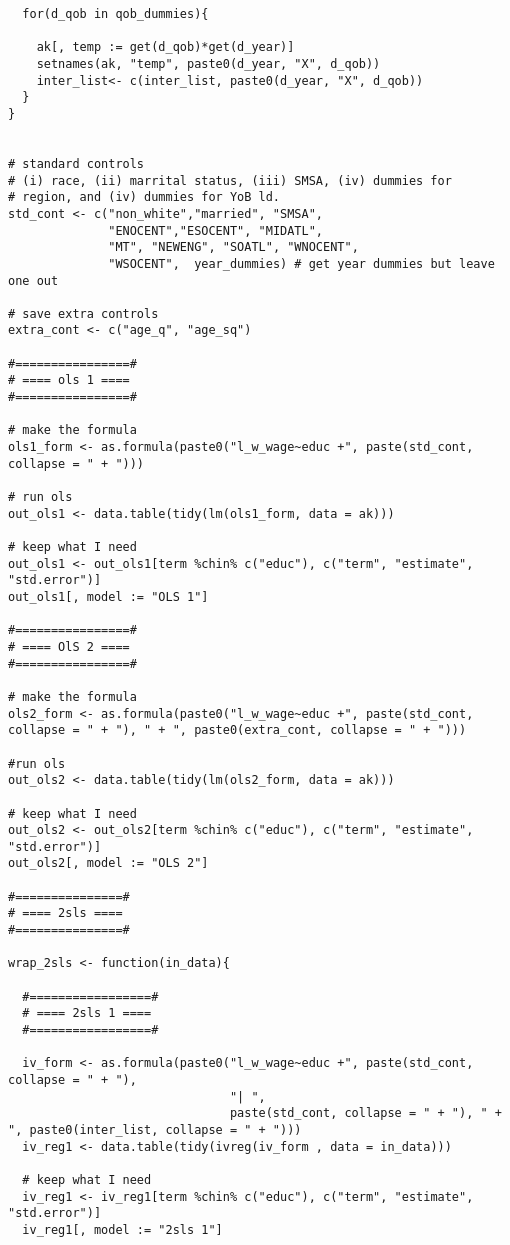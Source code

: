 \documentclass[12pt]{article}
\begin{document}
\begin{verbatim}
  for(d_qob in qob_dummies){
    
    ak[, temp := get(d_qob)*get(d_year)]
    setnames(ak, "temp", paste0(d_year, "X", d_qob))
    inter_list<- c(inter_list, paste0(d_year, "X", d_qob))
  }
}


# standard controls 
# (i) race, (ii) marrital status, (iii) SMSA, (iv) dummies for
# region, and (iv) dummies for YoB ld.
std_cont <- c("non_white","married", "SMSA", 
              "ENOCENT","ESOCENT", "MIDATL", 
              "MT", "NEWENG", "SOATL", "WNOCENT",
              "WSOCENT",  year_dummies) # get year dummies but leave one out 

# save extra controls 
extra_cont <- c("age_q", "age_sq")

#================#
# ==== ols 1 ====
#================#

# make the formula 
ols1_form <- as.formula(paste0("l_w_wage~educ +", paste(std_cont, collapse = " + ")))

# run ols 
out_ols1 <- data.table(tidy(lm(ols1_form, data = ak)))

# keep what I need 
out_ols1 <- out_ols1[term %chin% c("educ"), c("term", "estimate", "std.error")]
out_ols1[, model := "OLS 1"]

#================#
# ==== OlS 2 ====
#================#

# make the formula 
ols2_form <- as.formula(paste0("l_w_wage~educ +", paste(std_cont, collapse = " + "), " + ", paste0(extra_cont, collapse = " + ")))

#run ols
out_ols2 <- data.table(tidy(lm(ols2_form, data = ak)))

# keep what I need 
out_ols2 <- out_ols2[term %chin% c("educ"), c("term", "estimate", "std.error")]
out_ols2[, model := "OLS 2"]

#===============#
# ==== 2sls ====
#===============#

wrap_2sls <- function(in_data){
  
  #=================#
  # ==== 2sls 1 ====
  #=================#
  
  iv_form <- as.formula(paste0("l_w_wage~educ +", paste(std_cont, collapse = " + "), 
                               "| ", 
                               paste(std_cont, collapse = " + "), " + ", paste0(inter_list, collapse = " + ")))
  iv_reg1 <- data.table(tidy(ivreg(iv_form , data = in_data)))
  
  # keep what I need 
  iv_reg1 <- iv_reg1[term %chin% c("educ"), c("term", "estimate", "std.error")]
  iv_reg1[, model := "2sls 1"]
  

\end{verbatim}
\end{document}
